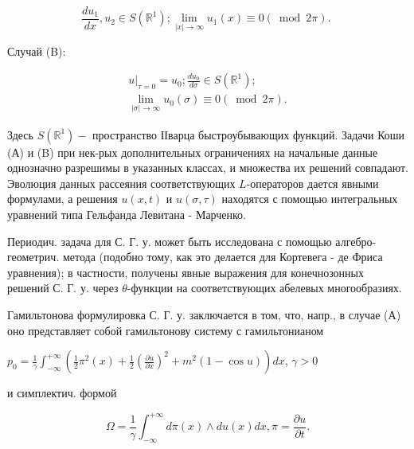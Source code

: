 \documentclass[10pt]{article}
\begin{document}
\[

\frac{d u_{1}}{d x}, u_{2} \in S\left(\mathbb{R}^{1}\right) ; \lim _{|x| \rightarrow \infty} u_{1}(x) \equiv 0(\bmod 2 \pi) \text {. }

\]



Случай (B):



\[

\begin{gathered}

\left.u\right|_{\tau=0}=u_{0} ; \frac{d u_{0}}{d \sigma} \in S\left(\mathbb{R}^{1}\right) ; \\

\lim _{|\sigma| \rightarrow \infty} u_{0}(\sigma) \equiv 0(\bmod 2 \pi) .

\end{gathered}

\]



Здесь $S\left(\mathbb{R}^{1}\right)-$ пространство ІІварца быстроубывающих функций. Задачи Коши (А) и (B) при нек-рых дополнительных ограничениях на начальные данные однозначно разрешимы в указанных классах, и множества их решений совпадают. Эволюция данных рассеяния соответствующих $L$-операторов дается явными формулами, а решения $u(x, t)$ и $u(\sigma, \tau)$ находятся с помощью интегральных уравнений типа Гельфанда Левитана - Марченко.



Периодич. задача для С. Г. у. может быть исследована с помощью алгебро-геометрич. метода (подобно тому, как это делается для Кортевега - де Фриса уравнения); в частности, получены явные выражения для конечнозонных решений С. Г. у. через $\theta$-функции на соответствующих абелевых многообразиях.



Гамильтонова формулировка С. Г. у. заключается в том, что, напр., в случае (А) оно представляет собой гамильтонову систему с гамильтонианом



$p_{0}=\frac{1}{\gamma} \int_{-\infty}^{+\infty}\left(\frac{1}{2} \pi^{2}(x)+\frac{1}{2}\left(\frac{\partial u}{\partial x}\right)^{2}+m^{2}(1-\cos u)\right) d x$, $\gamma>0$



и симплектич. формой



\[

\Omega=\frac{1}{\gamma} \int_{-\infty}^{+\infty} d \pi(x) \wedge d u(x) d x, \pi=\frac{\partial u}{\partial t} .

\]
\end{document}
